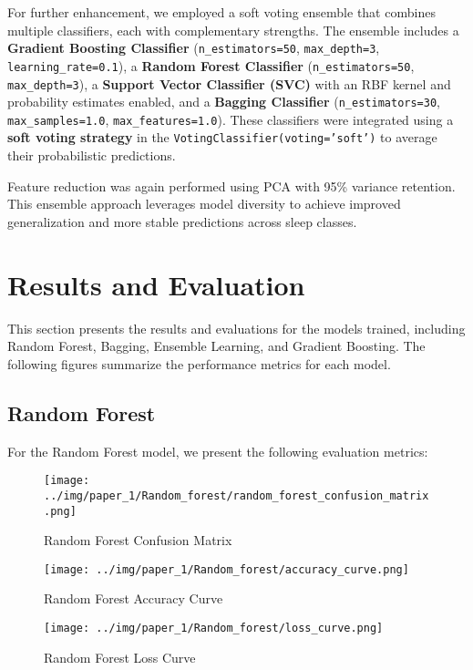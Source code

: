 \begin{sloppypar}
	For further enhancement, we employed a soft voting ensemble that combines multiple classifiers, each with complementary strengths. The ensemble includes a \textbf{Gradient Boosting Classifier} (\texttt{n\_estimators=50}, \texttt{max\_depth=3}, \texttt{learning\_rate=0.1}), a \textbf{Random Forest Classifier} (\texttt{n\_estimators=50}, \texttt{max\_depth=3}), a \textbf{Support Vector Classifier (SVC)} with an RBF kernel and probability estimates enabled, and a \textbf{Bagging Classifier} (\texttt{n\_estimators=30}, \texttt{max\_samples=1.0}, \texttt{max\_features=1.0}). These classifiers were integrated using a \textbf{soft voting strategy} in the \texttt{VotingClassifier(voting='soft')} to average their probabilistic predictions.
	
	Feature reduction was again performed using PCA with 95\% variance retention. This ensemble approach leverages model diversity to achieve improved generalization and more stable predictions across sleep classes.
\end{sloppypar}


\section{Results and Evaluation}

This section presents the results and evaluations for the models trained, including Random Forest, Bagging, Ensemble Learning, and Gradient Boosting. The following figures summarize the performance metrics for each model.

\subsection{Random Forest}

For the Random Forest model, we present the following evaluation metrics:

\begin{figure}[H]
	\centering
	\texttt{[image: ../img/paper\_1/Random\_forest/random\_forest\_confusion\_matrix.png]}
	\caption{Random Forest Confusion Matrix}
\end{figure}

\begin{figure}[H]
	\centering
	\texttt{[image: ../img/paper\_1/Random\_forest/accuracy\_curve.png]}
	\caption{Random Forest Accuracy Curve}
\end{figure}

\begin{figure}[H]
	\centering
	\texttt{[image: ../img/paper\_1/Random\_forest/loss\_curve.png]}
	\caption{Random Forest Loss Curve}
\end{figure}

